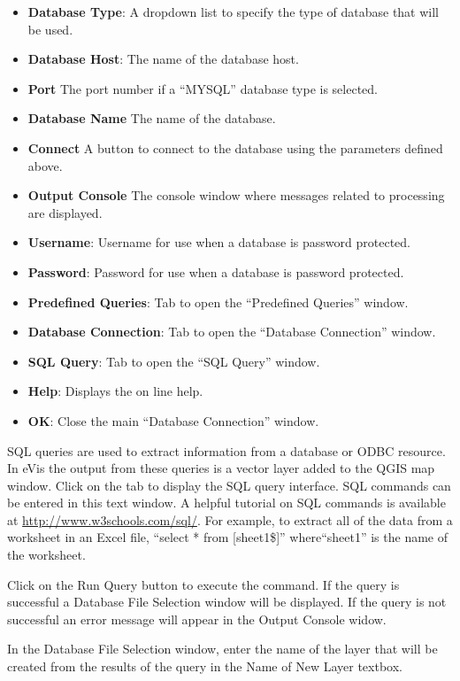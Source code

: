 \begin{itemize}[label=--]
\item \textbf{Database Type}: A dropdown list to specify the type of database that will be used.
\item \textbf{Database Host}: The name of the database host.
\item \textbf{Port} The port number if a ``MYSQL'' database type is selected.
\item \textbf{Database Name} The name of the database.
\item \textbf{Connect} A button to connect to the database using the parameters defined above.
\item \textbf{Output Console} The console window where messages related to processing are
displayed.
\item \textbf{Username}: Username for use when a database is password protected.
\item \textbf{Password}: Password for use when a database is password protected.
\item \textbf{Predefined Queries}: Tab to open the ``Predefined Queries'' window.
\item \textbf{Database Connection}: Tab to open the ``Database Connection'' window.
\item \textbf{SQL Query}: Tab to open the ``SQL Query'' window.
\item \textbf{Help}: Displays the on line help.
\item \textbf{OK}: Close the main ``Database Connection'' window.
\end{itemize}

\label{evis_running_sql}

SQL queries are used to extract information from a database or ODBC resource. In eVis the output
from these queries is a vector layer added to the QGIS map window. Click on the  tab
to display the SQL query interface. SQL commands can be entered in this text window. A helpful
tutorial on SQL commands is available at \url{http://www.w3schools.com/sql/}. For example, to
extract all of the data from a worksheet in an Excel file, ``select * from [sheet1\$]''
where``sheet1'' is the name of the worksheet.

Click on the Run Query button to execute the command. If the query is successful a Database File
Selection window will be displayed. If the query is not successful an error message will appear in
the Output Console widow.

In the Database File Selection window, enter the name of the layer that will be created from the
results of the query in the Name of New Layer textbox.

